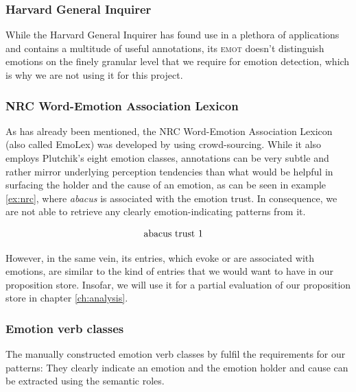 \subsubsection{Harvard General Inquirer}

While the Harvard General Inquirer \cite{general_inquirer} has found use in a plethora of applications and contains a multitude of useful annotations, its \textsc{emot} doesn't distinguish emotions on the finely granular level that we require for emotion detection, which is why we are not using it for this project.

\subsubsection{NRC Word-Emotion Association Lexicon} \label{sec:emolex}

As has already been mentioned, the NRC Word-Emotion Association Lexicon (also called EmoLex) was developed by \citeauthor{nrc_emolex} using crowd-sourcing. While it also employs Plutchik's eight emotion classes, annotations can be very subtle and rather mirror underlying perception tendencies than what would be helpful in surfacing the holder and the cause of an emotion, as can be seen in example \ref{ex:nrc}, where \textit{abacus} is associated with the emotion trust. In consequence, we are not able to retrieve any clearly emotion-indicating patterns from it.

\begin{align}
\begin{split}\label{ex:nrc}
&\textnormal{abacus	trust	1}
\end{split}
\end{align}

However, in the same vein, its entries, which evoke or are associated with emotions, are similar to the kind of entries that we would want to have in our proposition store. Insofar, we will use it for a partial evaluation of our proposition store in chapter \ref{ch:analysis}.

\subsubsection{Emotion verb classes}

The manually constructed emotion verb classes by \citeauthor{emotion_verbs} fulfil the requirements for our patterns: They clearly indicate an emotion and the emotion holder and cause can be extracted using the semantic roles.

